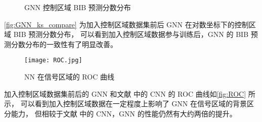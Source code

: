 \begin{figure}[ht]
    \centering
    \hfill
    \caption{GNN 控制区域 BIB 预测分数分布}
    \label{fig:GNN_ks_compare}
\end{figure}

\autoref{fig:GNN_ks_compare} 为加入控制区域数据集前后 GNN 在对数坐标下的控制区域 BIB 预测分数分布，
可以看到加入控制区域数据参与训练后，GNN 的 BIB 预测分数分布的一致性有了明显改善。

\begin{figure}[ht]
    \centering
    \texttt{[image: ROC.jpg]}
    \caption{NN 在信号区域的 ROC 曲线}
    \label{fig:ROC}
\end{figure}

加入控制区域数据集前后的 GNN 和文献\cite{ATLAS:2022zhj} 中的 CNN 的 ROC 曲线如\autoref{fig:ROC} 所示，
可以看到加入控制区域数据在一定程度上影响了 GNN 在信号区域的背景区分能力，
但相较于文献\cite{ATLAS:2022zhj} 中的 CNN，GNN 的性能仍然有大约两倍的提升。
